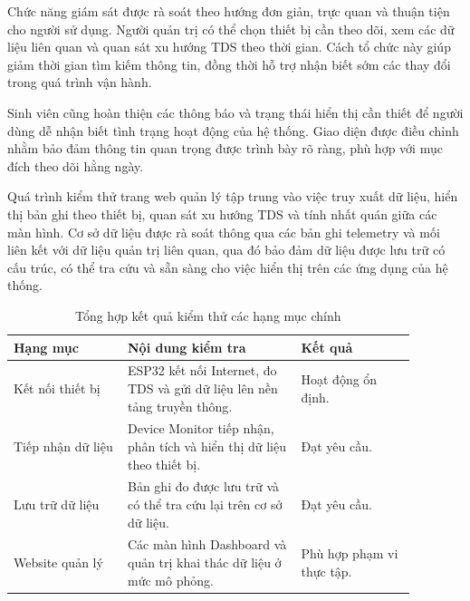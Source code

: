 
Chức năng giám sát được rà soát theo hướng đơn giản, trực quan và thuận tiện cho người sử dụng. Người quản trị có thể chọn thiết bị cần theo dõi, xem các dữ liệu liên quan và quan sát xu hướng TDS theo thời gian. Cách tổ chức này giúp giảm thời gian tìm kiếm thông tin, đồng thời hỗ trợ nhận biết sớm các thay đổi trong quá trình vận hành.

Sinh viên cũng hoàn thiện các thông báo và trạng thái hiển thị cần thiết để người dùng dễ nhận biết tình trạng hoạt động của hệ thống. Giao diện được điều chỉnh nhằm bảo đảm thông tin quan trọng được trình bày rõ ràng, phù hợp với mục đích theo dõi hằng ngày.

Quá trình kiểm thử trang web quản lý tập trung vào việc truy xuất dữ liệu, hiển thị bản ghi theo thiết bị, quan sát xu hướng TDS và tính nhất quán giữa các màn hình. Cơ sở dữ liệu được rà soát thông qua các bản ghi telemetry và mối liên kết với dữ liệu quản trị liên quan, qua đó bảo đảm dữ liệu được lưu trữ có cấu trúc, có thể tra cứu và sẵn sàng cho việc hiển thị trên các ứng dụng của hệ thống.

\begin{table}[H]
    \centering
    \renewcommand{\arraystretch}{1.2}
    \begin{tabular}{|p{0.25\linewidth}|p{0.38\linewidth}|p{0.25\linewidth}|}
        \hline
        \textbf{Hạng mục} & \textbf{Nội dung kiểm tra} & \textbf{Kết quả} \\
        \hline
        Kết nối thiết bị & ESP32 kết nối Internet, đo TDS và gửi dữ liệu lên nền tảng truyền thông. & Hoạt động ổn định. \\
        \hline
        Tiếp nhận dữ liệu & Device Monitor tiếp nhận, phân tích và hiển thị dữ liệu theo thiết bị. & Đạt yêu cầu. \\
        \hline
        Lưu trữ dữ liệu & Bản ghi đo được lưu trữ và có thể tra cứu lại trên cơ sở dữ liệu. & Đạt yêu cầu. \\
        \hline
        Website quản lý & Các màn hình Dashboard và quản trị khai thác dữ liệu ở mức mô phỏng. & Phù hợp phạm vi thực tập. \\
        \hline
    \end{tabular}
    \caption{Tổng hợp kết quả kiểm thử các hạng mục chính}
    \label{tab:week7-test-summary}
\end{table}


